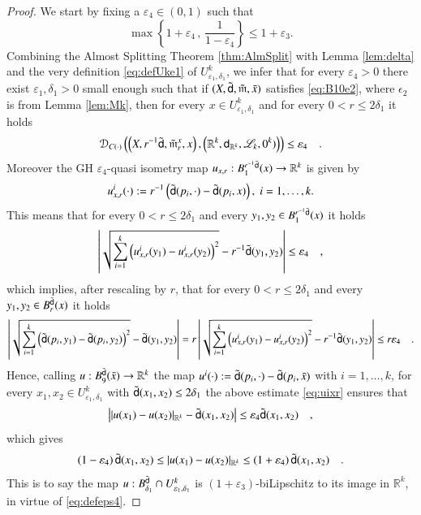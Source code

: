 \documentclass[11pt,reqno]{amsart}
\newcommand{\mm}{\mathfrak m}
\newcommand{\sfd}{{\sf d}}
\newcommand{\LL}{\mathscr{L}}
\newcommand{\R}{\mathbb{R}}
\newcommand{\DC}{\mathcal D_{C(\cdot)}}
\newcommand{\vare}{\varepsilon}
\theoremstyle{definition}
\theoremstyle{remark}
\theoremstyle{remark}
\theoremstyle{remark}
\theoremstyle{remark}
\theoremstyle{remark}
\theoremstyle{remark}
\theoremstyle{remark}
\begin{document}
\begin{proof}
We start by fixing  a $\varepsilon_4\in (0,1)$  such that  
\begin{equation}\label{eq:defeps4}
\max \left\{1+\vare_4\, , \, \frac{1}{1-\vare_4} \right\} \leq 1+\vare_3.
\end{equation}
Combining the Almost Splitting Theorem \ref{thm:AlmSplit} with Lemma \ref{lem:delta} and the very definition \eqref {eq:defUke1} of $U^k_{\vare_1, \delta_1}$, we infer that for every $\vare_4>0$ there exist $\vare_1,\delta_1>0$ small enough such that if $(X,\tilde{\sfd}, \tilde{\mm}, \bar{x})$ satisfies \eqref{eq:B10e2}, where $\epsilon_2$ is from Lemma \ref{lem:Mk}, then for every $x \in  U^k_{\vare_1, \delta_1}$ and for every $0<r\leq 2 \delta_1$ it holds
\begin{equation}\label{eq:DXRk}
\DC \left( \left(X, r^{-1} \tilde{\sfd}, \tilde{\mm}^x_r, x \right), \left( \R^k ,\sfd_{\R^k},\LL_k, 0^k)  \right) \right) \leq  \vare_4 \quad . 
\end{equation}
Moreover the  GH $\vare_4$-quasi isometry map $u_{x,r}:B^{r^{-1}\tilde{\sfd}}_{1}(x) \to \R^k$ is  given by 
$$u^i_{x,r}(\cdot):=r^{-1}\left( \tilde{\sfd}(p_i,\cdot)- \tilde{\sfd}(p_i,x)\right), \; i=1,\ldots,k.$$
This means that for every $0<r \leq 2 \delta_1$ and every $y_1,y_2 \in B^{r^{-1}\tilde{\sfd}}_{1}(x)$  it holds
$$ \left| \sqrt{\sum_{i=1}^k  \left(u^i_{x,r} (y_1)- u^i_{x,r}(y_2) \right)^2} -  r^{-1} \tilde{\sfd} (y_1,y_2)  \right|  \leq  \vare_4 \quad ,$$
which implies, after rescaling by $r$, that for every $0<r \leq 2 \delta_1$ and every $y_1,y_2 \in B^{\tilde{\sfd}}_{r}(x)$  it holds
\begin{equation} \label{eq:uixr}
\left| \sqrt{\sum_{i=1}^k  \left( \tilde{\sfd}(p_i,y_1)- \tilde{\sfd}(p_i,y_2) \right)^2} -   \tilde{\sfd} (y_1,y_2)  \right| = r  \left| \sqrt{\sum_{i=1}^k  \left(u^i_{x,r} (y_1)- u^i_{x,r}(y_2) \right)^2} -  r^{-1} \tilde{\sfd} (y_1,y_2)  \right|  \leq r \vare_4\quad.
\end{equation}
Hence, calling $u: B^{\tilde{\sfd}}_9(\bar{x})\to \R^k$ the map $u^i(\cdot):=\tilde{\sfd}(p_i,\cdot)-\tilde{\sfd}(p_i,\bar{x})$ with $i=1,\ldots,k$,  for every $x_1,x_2 \in U^k_{\vare_1, \delta_1}$ with $\tilde{\sfd}(x_1,x_2)\leq 2 \delta_1$ the above estimate \eqref{eq:uixr} ensures that
$$\left|  | u(x_1)-u(x_2)|_{\R^k} - \tilde{\sfd}(x_1,x_2) \right| \leq \vare_4 \tilde{\sfd}(x_1,x_2) \quad, $$
which gives
\begin{equation}\label{eq:uLip}
(1-\vare_4) \,  \tilde{\sfd}(x_1,x_2) \leq  | u(x_1)-u(x_2)|_{\R^k} \leq  (1+\vare_4) \, \tilde{\sfd}(x_1,x_2) \quad.
\end{equation}
This is to say the map $u:B^{\tilde{\sfd}}_{\delta_1}\cap  U^k_{\vare_1, \delta_1}$ is $(1+\vare_3)$-biLipschitz to its image in $\R^k$, in virtue of \eqref{eq:defeps4}. 
\end{proof}
\end{document}
